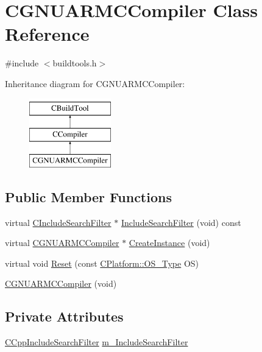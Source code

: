 \hypertarget{classCGNUARMCCompiler}{\section{C\-G\-N\-U\-A\-R\-M\-C\-Compiler Class Reference}
\label{classCGNUARMCCompiler}
}


{\ttfamily \#include $<$buildtools.\-h$>$}

Inheritance diagram for C\-G\-N\-U\-A\-R\-M\-C\-Compiler\-:\begin{figure}[H]
\begin{center}
\leavevmode
\includegraphics[height=3.000000cm]{d4/d7d/classCGNUARMCCompiler}
\end{center}
\end{figure}
\subsection*{Public Member Functions}
\begin{DoxyCompactItemize}
\item 
virtual \hyperlink{classCIncludeSearchFilter}{C\-Include\-Search\-Filter} $\ast$ \hyperlink{classCGNUARMCCompiler_a455c9c55a802d6a2e7e6d5146e252554}{Include\-Search\-Filter} (void) const 
\item 
virtual \hyperlink{classCGNUARMCCompiler}{C\-G\-N\-U\-A\-R\-M\-C\-Compiler} $\ast$ \hyperlink{classCGNUARMCCompiler_a3e102dcc65d172a098282c5554e79302}{Create\-Instance} (void)
\item 
virtual void \hyperlink{classCGNUARMCCompiler_a379674393ab735aae49e718d8da8d71a}{Reset} (const \hyperlink{classCPlatform_a2fb735c63c53052f79629e338bb0f535}{C\-Platform\-::\-O\-S\-\_\-\-Type} O\-S)
\item 
\hyperlink{classCGNUARMCCompiler_a7efc42cb3cc52d2dc0aac6e519b587bb}{C\-G\-N\-U\-A\-R\-M\-C\-Compiler} (void)
\end{DoxyCompactItemize}
\subsection*{Private Attributes}
\begin{DoxyCompactItemize}
\item 
\hyperlink{classCCppIncludeSearchFilter}{C\-Cpp\-Include\-Search\-Filter} \hyperlink{classCGNUARMCCompiler_abc5e6d8b8b6564fe7e8ba76c10be42ff}{m\-\_\-\-Include\-Search\-Filter}
\end{DoxyCompactItemize}
